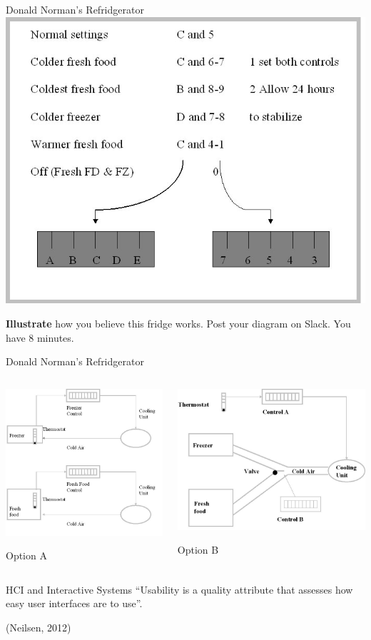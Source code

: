 \begin{frame}{Donald Norman's Refridgerator}		
	\includegraphics[height=24ex]{norman_fridge_controls.jpg}
	
	\vspace{2ex}
	
	\textbf{Illustrate} how you believe this fridge works. Post your diagram on Slack. You have 8 minutes.
\end{frame}

\begin{frame}{Donald Norman's Refridgerator}
	\begin{columns}[onlytextwidth]
		\begin{column}{0.45\textwidth}
			\includegraphics[height=20ex]{norman_fridge_mental_model.jpg}
			
			Option A
		\end{column}
		\begin{column}{0.45\textwidth}
			\includegraphics[height=20ex]{norman_fridge_actual_design.jpg}
			
			Option B
		\end{column}
	\end{columns}
\end{frame}

\begin{frame}{HCI and Interactive Systems}
	``Usability is a quality attribute that assesses how easy user interfaces are to use''.
	
	\vspace{2ex}
	
	(Neilsen, 2012)
\end{frame}

